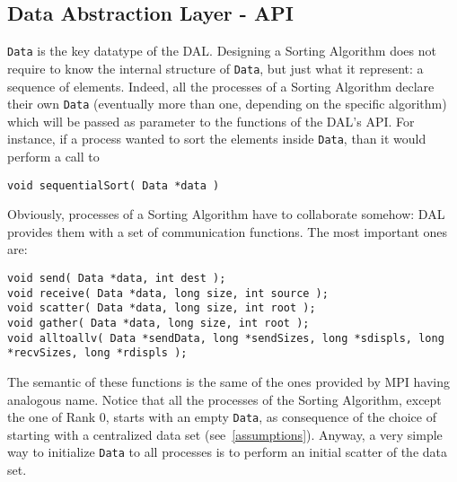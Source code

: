 \subsection*{Data Abstraction Layer - API}
\texttt{Data} is the key datatype of the DAL. Designing a Sorting Algorithm does not require to know the internal structure of \texttt{Data}, but just what it represent: a sequence of elements. Indeed, all the processes of a Sorting Algorithm declare their own \texttt{Data} (eventually more than one, depending on the specific algorithm) which will be passed as parameter to the functions of the DAL's API. For instance, if a process wanted to sort the elements inside \texttt{Data}, than it would perform a call to
\begin{lstlisting}
void sequentialSort( Data *data )
\end{lstlisting}
Obviously, processes of a Sorting Algorithm have to collaborate somehow: DAL provides them with a set of communication functions. The most important ones are:
\begin{lstlisting}
void send( Data *data, int dest );
void receive( Data *data, long size, int source );
void scatter( Data *data, long size, int root );
void gather( Data *data, long size, int root );
void alltoallv( Data *sendData, long *sendSizes, long *sdispls, long *recvSizes, long *rdispls );
\end{lstlisting}
The semantic of these functions is the same of the ones provided by MPI having analogous name. Notice that all the processes of the Sorting Algorithm, except the one of Rank $0$, starts with an empty \texttt{Data}, as consequence of the choice of starting with a centralized data set (see~\ref{assumptions}). Anyway, a very simple way to initialize \texttt{Data} to all processes is to perform an initial scatter of the data set.

